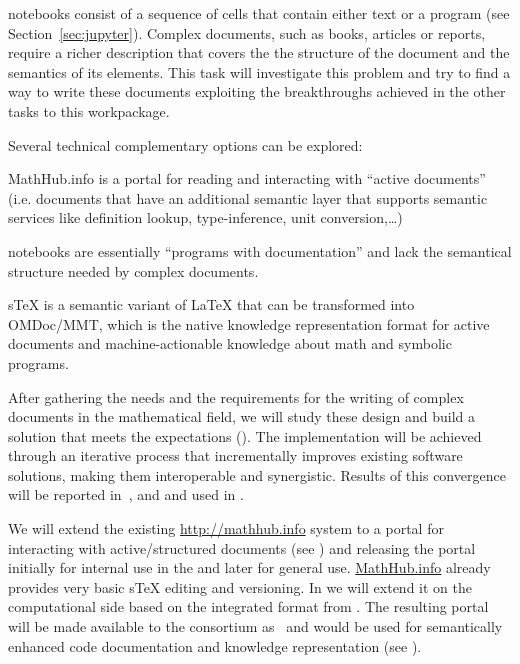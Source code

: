 \begin{workpackage}
\begin{tasklist}
\begin{task}[title=Structured documents,id=structdocs,
  lead=JU,PM=22,lead=JU,partners={SR,USH,LL},wphases=0-24]

  \Jupyter notebooks consist of a sequence of cells that contain
  either text or a program (see Section~\ref{sec:jupyter}). Complex
  documents, such as books, articles or reports, require a richer
  description that covers the the structure of the document and the
  semantics of its elements. This task will investigate this problem
  and try to find a way to write these documents exploiting the
  breakthroughs achieved in the other tasks to this workpackage.

  Several technical complementary options can be explored:
  \begin{compactitem}
  \item MathHub.info is a portal for reading and interacting with
    ``active documents'' (i.e. documents that have an additional
    semantic layer that supports semantic services like definition
    lookup, type-inference, unit conversion,\ldots)
  \item \Jupyter notebooks are essentially ``programs with documentation'' and lack the
    semantical structure needed by complex documents.
  \item sTeX is a semantic variant of LaTeX that can be transformed into OMDoc/MMT, which
    is the native knowledge representation format for active documents and
    machine-actionable knowledge about math and symbolic programs.
  \end{compactitem}

  After gathering the needs and the requirements for the writing of
  complex documents in the mathematical field, we will study these
  design and build a solution that meets the expectations
  (). The implementation will be achieved
  through an iterative process that incrementally improves existing
  software solutions, making them interoperable and synergistic.
  Results of this convergence will be reported
  in~,  and
   and used in .
\end{task}

\begin{task}[id=mathhub,title=Active Documents Portal,lead=JU,PM=12,
  wphases=12-36!.5]
  We will extend the existing \url{http://mathhub.info} system to a
  portal for interacting with active/structured documents (see
  ) and releasing the portal initially for
  internal use in the \TheProject and later for general
  use. \url{MathHub.info} already provides very basic sTeX editing and
  versioning. In \TheProject we will extend it on the computational
  side based on the integrated format from
  . The resulting portal will be made
  available to the consortium as~ and
  would be used for semantically enhanced code documentation and
  knowledge representation (see ).
\end{task}


\end{tasklist}
\end{workpackage}
